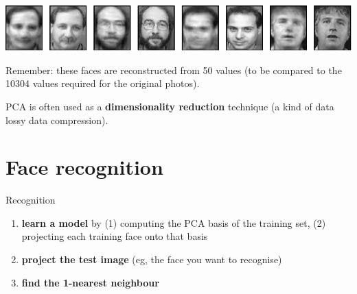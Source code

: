 \documentclass[compress]{beamer}
\begin{document}
\begin{frame}{}
    \begin{center}
        \includegraphics[width=\linewidth]{reconstruction-50-eigenfaces-top-row}

        \vspace{2em}
        Remember: these faces are reconstructed from 50 values (to be compared
        to the 10304 values required for the original photos).

        \vspace{2em}

        \pause

        PCA is often used as a \textbf{dimensionality reduction} technique (\ie a
        kind of data lossy data compression).

    \end{center}
\end{frame}


\section[Face recognition]{Face recognition}



\begin{frame}{Recognition}

    \begin{enumerate}
        \item \textbf{learn a model} by (1) computing the PCA basis of the
            training set, (2) projecting each training face onto that basis
        \item \textbf{project the test image} (eg, the face you want to
            recognise)
        \item \textbf{find the 1-nearest neighbour}
    \end{enumerate}
\end{frame}
\end{document}
